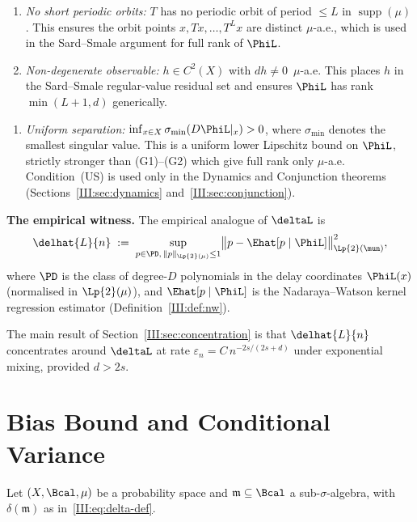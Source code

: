 \begin{enumerate}[label=(G\arabic*)]
  \item \emph{No short periodic orbits:}
    $T$ has no periodic orbit of period $\leq L$ in $\operatorname{supp}(\mu)$.
    This ensures the orbit points $x, Tx, \ldots, T^L x$ are distinct
    $\mu$-a.e., which is used in the Sard--Smale argument for full rank of
    $\PhiL$.

  \item \emph{Non-degenerate observable:}
    $h \in C^2(X)$ with $dh \neq 0$~$\mu$-a.e.
    This places $h$ in the Sard--Smale regular-value residual set and
    ensures $\PhiL$ has rank $\min(L+1,d)$ generically.
\end{enumerate}

\begin{enumerate}[label=(US)]
  \item \emph{Uniform separation:}
    $\inf_{x \in X} \sigma_{\min}(D\PhiL|_x) > 0$,
    where $\sigma_{\min}$ denotes the smallest singular value.
    This is a uniform lower Lipschitz bound on $\PhiL$, strictly stronger than
    (G1)--(G2) which give full rank only $\mu$-a.e.
    Condition~(US) is used only in the Dynamics and Conjunction theorems
    (Sections~\ref{III:sec:dynamics} and~\ref{III:sec:conjunction}).
\end{enumerate}

\textbf{The empirical witness.}\enspace
The empirical analogue of $\deltaL$ is
\[
  \delhat{L}{n}
  \;:=\;
  \sup_{p \in \PD,\, \|p\|_{\Lp{2}(\mu)} \leq 1}
  \bigl\|p - \Ehat[p \mid \PhiL]\bigr\|_{\Lp{2}(\mun)}^2,
\]
where $\PD$ is the class of degree-$D$ polynomials in the delay coordinates
$\PhiL(x)$ (normalised in $\Lp{2}(\mu)$), and $\Ehat[p \mid \PhiL]$ is the
Nadaraya--Watson kernel regression estimator (Definition~\ref{III:def:nw}).

The main result of Section~\ref{III:sec:concentration} is that $\delhat{L}{n}$
concentrates around $\deltaL$ at rate $\varepsilon_n = C\,n^{-2s/(2s+d)}$
under exponential mixing, provided $d > 2s$.

\section{Bias Bound and Conditional Variance}
\label{III:sec:bias}

Let $(X, \Bcal, \mu)$ be a probability space and $\mathfrak{m} \subseteq \Bcal$
a sub-$\sigma$-algebra, with $\delta(\mathfrak{m})$ as in~\eqref{III:eq:delta-def}.

